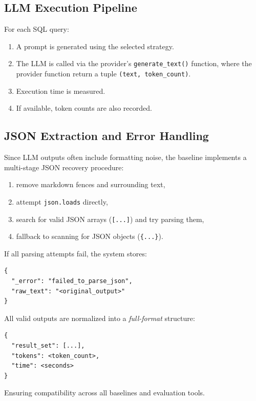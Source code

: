 \documentclass[12pt]{article}
\begin{document}
\subsection{LLM Execution Pipeline}

For each SQL query:
\begin{enumerate}
    \item A prompt is generated using the selected strategy.
    \item The LLM is called via the provider's \verb|generate_text()| function, where the provider
          function return a tuple \verb|(text, token_count)|.
    \item Execution time is measured.
    \item If available, token counts are also recorded.
\end{enumerate}

\subsection{JSON Extraction and Error Handling}

Since LLM outputs often include formatting noise, the baseline implements a multi-stage JSON recovery procedure:

\begin{enumerate}
    \item remove markdown fences and surrounding text,
    \item attempt \verb|json.loads| directly,
    \item search for valid JSON arrays (\verb|[...]|) and try parsing them,
    \item fallback to scanning for JSON objects (\verb|{...}|).
\end{enumerate}

If all parsing attempts fail, the system stores:

\begin{verbatim}
{
  "_error": "failed_to_parse_json",
  "raw_text": "<original_output>"
}
\end{verbatim}

All valid outputs are normalized into a \emph{full-format} structure:

\begin{verbatim}
{
  "result_set": [...],
  "tokens": <token_count>,
  "time": <seconds>
}
\end{verbatim}

Ensuring compatibility across all baselines and evaluation tools.
\end{document}

